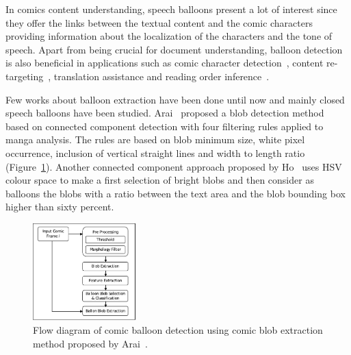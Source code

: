 In comics content understanding, speech balloons present a lot of interest since they offer the links between the textual content and the comic characters providing information about the localization of the characters and the tone of speech.
Apart from being crucial for document understanding, balloon detection is also beneficial in applications such as comic character detection~\cite{Sun2011}, content re-targeting~\cite{Matsui2011}, translation assistance and reading order inference~\cite{Guerin2012Ontologies}.

Few works about balloon extraction have been done until now and mainly closed speech balloons have been studied.
Arai~\cite{Arai11} proposed a blob detection method based on connected component detection with four filtering rules applied to manga analysis.
The rules are based on blob minimum size, white pixel occurrence, inclusion of vertical straight lines and width to length ratio (Figure~\ref{fig:Arai_balloon_extraction_process}).
Another connected component approach proposed by Ho~\cite{Ho2012} uses HSV colour space to make a first selection of bright blobs and then consider as balloons the blobs with a ratio between the text area and the blob bounding box higher than sixty percent.


 \begin{figure}[!ht]  %
   \centering
  \includegraphics[trim= 0px 0px 0px 0px, clip, width=150px]{Arai_balloon_extraction_process.pdf}
  \caption[Flow diagram of comic balloon detection]{Flow diagram of comic balloon detection using comic blob extraction method proposed by Arai~\cite{Arai11}.}
  \label{fig:Arai_balloon_extraction_process}
 \end{figure}

